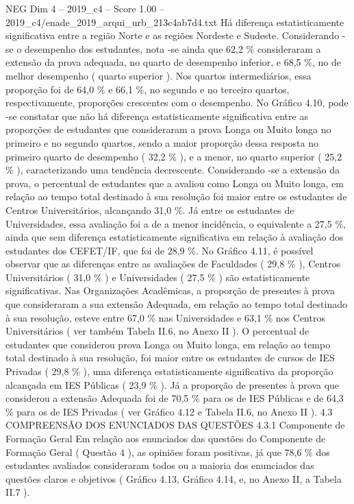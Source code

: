 \begin{textsample}{NEG Dim 4 – 2019\_c4 – Score 1.00 – 2019\_c4/enade\_2019\_arqui\_urb\_213c4ab7d4.txt}
Há diferença estatisticamente significativa entre a região Norte e as regiões Nordeste e Sudeste.
Considerando -se o desempenho dos estudantes, nota -se ainda que 62,2 \% consideraram a extensão da prova adequada, no quarto de desempenho inferior, e 68,5 \%, no de melhor desempenho ( quarto superior ).
Nos quartos intermediários, essa proporção foi de 64,0 \% e 66,1 \%, no segundo e no terceiro quartos, respectivamente, proporções crescentes com o desempenho.
No Gráfico 4.10, pode -se constatar que não há diferença estatisticamente significativa entre as proporções de estudantes que consideraram a prova Longa ou Muito longa no primeiro e no segundo quartos, sendo a maior proporção dessa resposta no primeiro quarto de desempenho ( 32,2 \% ), e a menor, no quarto superior ( 25,2 \% ), caracterizando uma tendência decrescente.
Considerando -se a extensão da prova, o percentual de estudantes que a avaliou como Longa ou Muito longa, em relação ao tempo total destinado à sua resolução foi maior entre os estudantes de Centros Universitários, alcançando 31,0 \%.
Já entre os estudantes de Universidades, essa avaliação foi a de a menor incidência, o equivalente a 27,5 \%, ainda que sem diferença estatisticamente significativa em relação à avaliação dos estudantes dos CEFET/IF, que foi de 28,9 \%.
No Gráfico 4.11, é possível observar que as diferenças entre as avaliações de Faculdades ( 29,8 \% ), Centros Universitários ( 31,0 \% ) e Universidades ( 27,5 \% ) são estatisticamente significativas.
Nas Organizações Acadêmicas, a proporção de presentes à prova que consideraram a sua extensão Adequada, em relação ao tempo total destinado à sua resolução, esteve entre 67,0 \% nas Universidades e 63,1 \% nos Centros Universitários ( ver também Tabela II.6, no Anexo II ).
O percentual de estudantes que considerou prova Longa ou Muito longa, em relação ao tempo total destinado à sua resolução, foi maior entre os estudantes de cursos de IES Privadas ( 29,8 \% ), uma diferença estatisticamente significativa da proporção alcançada em IES Públicas ( 23,9 \% ).
Já a proporção de presentes à prova que considerou a extensão Adequada foi de 70,5 \% para os de IES Públicas e de 64,3 \% para os de IES Privadas ( ver Gráfico 4.12 e Tabela II.6, no Anexo II ). 4.3 COMPREENSÃO DOS ENUNCIADOS DAS QUESTÕES 4.3.1 Componente de Formação Geral Em relação aos enunciados das questões do Componente de Formação Geral ( Questão 4 ), as opiniões foram positivas, já que 78,6 \% dos estudantes avaliados consideraram todos ou a maioria dos enunciados das questões claros e objetivos ( Gráfico 4.13, Gráfico 4.14, e, no Anexo II, a Tabela II.7 ).

\end{textsample}
